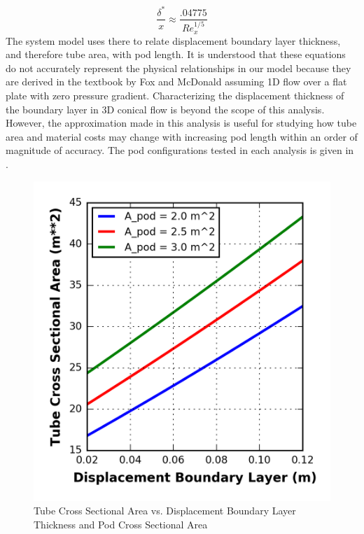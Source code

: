 \begin{equation}
	\label{eq:boundary_layer}
	\frac{\delta^{*}}{x} \approx  \frac{.04775}{Re_{x}^{1/5}}
\end{equation}
The system model uses there to relate displacement boundary layer thickness, and therefore tube area, with pod length. It is understood that these equations do not accurately represent the physical relationships in our model because they are derived in the textbook by Fox and McDonald assuming 1D flow over a flat plate with zero pressure gradient. Characterizing the displacement thickness of the boundary layer in 3D conical flow is beyond the scope of this analysis. However, the approximation made in this analysis is useful for studying how tube area and material costs may change with increasing pod length within an order of magnitude of accuracy.  The pod configurations tested in each analysis is given in .
\begin{table}
	\centering
	\caption{Configurations in boundary layer sensitivity study}
	\label{tbl:boundary_layer_sensitivty_configs}
\end{table}
\begin{figure}
	\centering
	\caption{Tube Cross Sectional Area vs. Displacement Boundary Layer Thickness and Pod Cross Sectional Area}
	\label{fig:cross_sec_area_vs_disp_boundary_layer}
	\includegraphics{../../images/graphs/boundary_layer_growth_trades/Tube_Area_vs_boundary_layer.png}
\end{figure}

